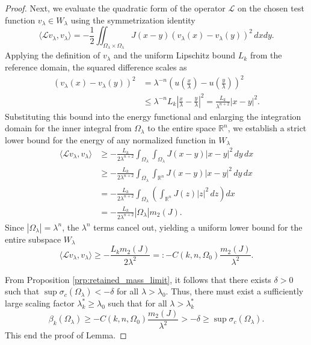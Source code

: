 \documentclass[12pt, a4paper]{article}
\theoremstyle{break}
\theoremstyle{break}
\theoremstyle{break}
\theoremstyle{break}
\theoremstyle{break}
\theoremstyle{break}
\theoremstyle{break}
\theoremstyle{break}
\theoremstyle{break}
\begin{document}
\begin{proof}
    Next, we evaluate the quadratic form of the operator $\mathcal{L}$ on the chosen test function $v_\lambda \in W_\lambda$ using the symmetrization identity
    \begin{equation}
        \langle \mathcal{L}v_\lambda, v_\lambda \rangle = -\frac{1}{2} \iint_{\Omega_\lambda \times \Omega_\lambda} J(x-y) (v_\lambda(x) - v_\lambda(y))^2 \, dx dy.
    \end{equation}
    Applying the definition of $v_\lambda$ and the uniform Lipschitz bound $L_k$ from the reference domain, the squared difference scales as
    \begin{align} \label{eq:lipschitz_scaling}
        (v_\lambda(x) - v_\lambda(y))^2 &= \lambda^{-n} \left( u\left(\frac{x}{\lambda}\right) - u\left(\frac{y}{\lambda}\right) \right)^2 \nonumber \\
        &\leq \lambda^{-n} L_k \left| \frac{x}{\lambda} - \frac{y}{\lambda} \right|^2 = \frac{L_k}{\lambda^{n+2}} |x-y|^2.
    \end{align}
    Substituting this bound into the energy functional and enlarging the integration domain for the inner integral from $\Omega_\lambda$ to the entire space $\mathbb{R}^n$, we establish a strict lower bound for the energy of any normalized function in $W_\lambda$
    \begin{align} \label{eq:energy_scaling_bound_k}
        \langle \mathcal{L}v_\lambda, v_\lambda \rangle &\geq -\frac{L_k}{2 \lambda^{n+2}} \int_{\Omega_\lambda} \int_{\Omega_\lambda} J(x-y) |x-y|^2 \, dy \, dx \nonumber \\
        &\geq -\frac{L_k}{2 \lambda^{n+2}} \int_{\Omega_\lambda} \int_{\mathbb{R}^n} J(x-y) |x-y|^2 \, dy \, dx \nonumber \\
        &= -\frac{L_k}{2 \lambda^{n+2}} \int_{\Omega_\lambda} \left( \int_{\mathbb{R}^n} J(z) |z|^2 \, dz \right) dx \nonumber \\
        &= -\frac{L_k}{2 \lambda^{n+2}} |\Omega_\lambda| m_2(J).
    \end{align}
    Since $|\Omega_\lambda| = \lambda^n$, the $\lambda^n$ terms cancel out, yielding a uniform lower bound for the entire subspace $W_\lambda$
    \begin{equation}
        \langle \mathcal{L}v_\lambda, v_\lambda \rangle \geq -\frac{L_k m_2(J)}{2 \lambda^2} =: - C(k,n,\Omega_0)  \frac{ m_2(J) }{\lambda^2}.
    \end{equation}

    From Proposition \ref{prp:retained_mass_limit}, it follows that there exists $\delta > 0$ such that $\sup \sigma_c(\Omega_\lambda) < - \delta$ for all $\lambda > \lambda_0$. Thus, there must exist a sufficiently large scaling factor $\lambda_k^* \geq \lambda_0$ such that for all $\lambda > \lambda_k^*$
    \begin{equation}
        \beta_k(\Omega_\lambda) \geq - C(k,n,\Omega_0) \frac{m_2(J)}{\lambda^2} > -\delta \geq \sup \sigma_c(\Omega_\lambda).
    \end{equation}
    This end the proof of Lemma.
\end{proof}
\end{document}

